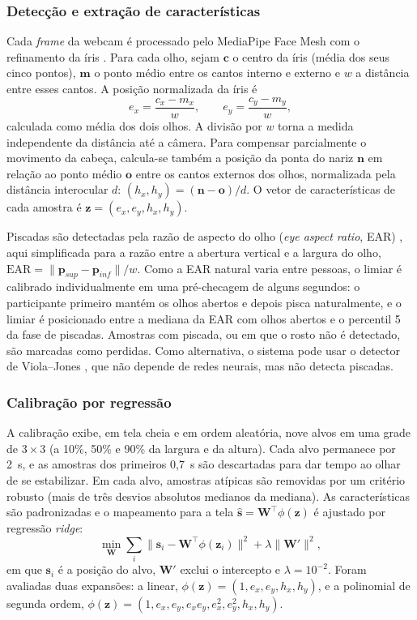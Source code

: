 \documentclass[sigconf, nonacm, language=english, language=portuguese, natbib=false]{acmart}
\begin{document}
\subsubsection{Detecção e extração de características}
Cada \emph{frame} da webcam é processado pelo MediaPipe Face Mesh com o refinamento da íris \cite{kartynnik2019, ablavatski2020}. Para cada olho, sejam $\mathbf{c}$ o centro da íris (média dos seus cinco pontos), $\mathbf{m}$ o ponto médio entre os cantos interno e externo e $w$ a distância entre esses cantos. A posição normalizada da íris é
\begin{equation}
  e_x = \frac{c_x - m_x}{w}, \qquad e_y = \frac{c_y - m_y}{w},
\end{equation}
calculada como média dos dois olhos. A divisão por $w$ torna a medida independente da distância até a câmera. Para compensar parcialmente o movimento da cabeça, calcula-se também a posição da ponta do nariz $\mathbf{n}$ em relação ao ponto médio $\mathbf{o}$ entre os cantos externos dos olhos, normalizada pela distância interocular $d$: $(h_x, h_y) = (\mathbf{n} - \mathbf{o})/d$. O vetor de características de cada amostra é $\mathbf{z} = (e_x, e_y, h_x, h_y)$.

Piscadas são detectadas pela razão de aspecto do olho (\emph{eye aspect ratio}, EAR) \cite{soukupova2016}, aqui simplificada para a razão entre a abertura vertical e a largura do olho, $\mathrm{EAR} = \lVert \mathbf{p}_{sup} - \mathbf{p}_{inf} \rVert / w$. Como a EAR natural varia entre pessoas, o limiar é calibrado individualmente em uma pré-checagem de alguns segundos: o participante primeiro mantém os olhos abertos e depois pisca naturalmente, e o limiar é posicionado entre a mediana da EAR com olhos abertos e o percentil 5 da fase de piscadas. Amostras com piscada, ou em que o rosto não é detectado, são marcadas como perdidas. Como alternativa, o sistema pode usar o detector de Viola--Jones \cite{viola2001}, que não depende de redes neurais, mas não detecta piscadas.

\subsubsection{Calibração por regressão}
A calibração exibe, em tela cheia e em ordem aleatória, nove alvos em uma grade de $3\times3$ (a 10\%, 50\% e 90\% da largura e da altura). Cada alvo permanece por 2~s, e as amostras dos primeiros 0{,}7~s são descartadas para dar tempo ao olhar de se estabilizar. Em cada alvo, amostras atípicas são removidas por um critério robusto (mais de três desvios absolutos medianos da mediana). As características são padronizadas e o mapeamento para a tela $\hat{\mathbf{s}} = \mathbf{W}^\top \phi(\mathbf{z})$ é ajustado por regressão \emph{ridge}:
\begin{equation}
  \min_{\mathbf{W}} \sum_i \lVert \mathbf{s}_i - \mathbf{W}^\top \phi(\mathbf{z}_i) \rVert^2 + \lambda \lVert \mathbf{W}' \rVert^2,
\end{equation}
em que $\mathbf{s}_i$ é a posição do alvo, $\mathbf{W}'$ exclui o intercepto e $\lambda = 10^{-2}$. Foram avaliadas duas expansões: a linear, $\phi(\mathbf{z}) = (1, e_x, e_y, h_x, h_y)$, e a polinomial de segunda ordem, $\phi(\mathbf{z}) = (1, e_x, e_y, e_x e_y, e_x^2, e_y^2, h_x, h_y)$.
\end{document}
